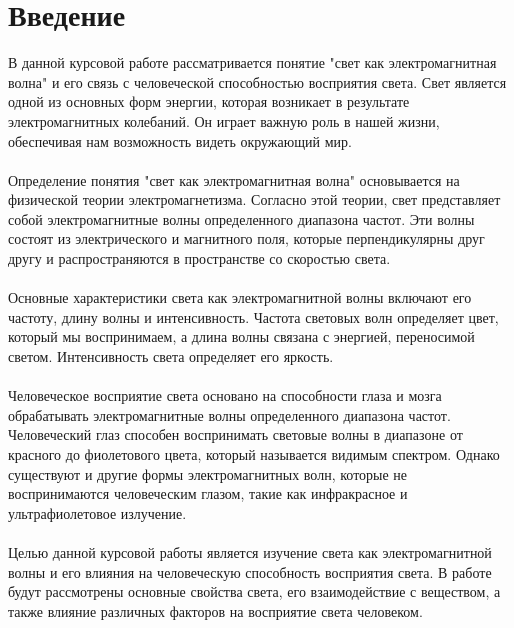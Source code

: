 \documentclass{article}
\begin{document}
\section{Введение}
В данной курсовой работе рассматривается понятие "{}{}свет как электромагнитная волна"{}{} и его связь с человеческой способностью восприятия света. Свет является одной из основных форм энергии, которая возникает в результате электромагнитных колебаний. Он играет важную роль в нашей жизни, обеспечивая нам возможность видеть окружающий мир.\\
~\\
Определение понятия "{}{}свет как электромагнитная волна"{}{} основывается на физической теории электромагнетизма. Согласно этой теории, свет представляет собой электромагнитные волны определенного диапазона частот. Эти волны состоят из электрического и магнитного поля, которые перпендикулярны друг другу и распространяются в пространстве со скоростью света.\\
~\\
Основные характеристики света как электромагнитной волны включают его частоту, длину волны и интенсивность. Частота световых волн определяет цвет, который мы воспринимаем, а длина волны связана с энергией, переносимой светом. Интенсивность света определяет его яркость.\\
~\\
Человеческое восприятие света основано на способности глаза и мозга обрабатывать электромагнитные волны определенного диапазона частот. Человеческий глаз способен воспринимать световые волны в диапазоне от красного до фиолетового цвета, который называется видимым спектром. Однако существуют и другие формы электромагнитных волн, которые не воспринимаются человеческим глазом, такие как инфракрасное и ультрафиолетовое излучение.\\
~\\
Целью данной курсовой работы является изучение света как электромагнитной волны и его влияния на человеческую способность восприятия света. В работе будут рассмотрены основные свойства света, его взаимодействие с веществом, а также влияние различных факторов на восприятие света человеком.
\end{document}
